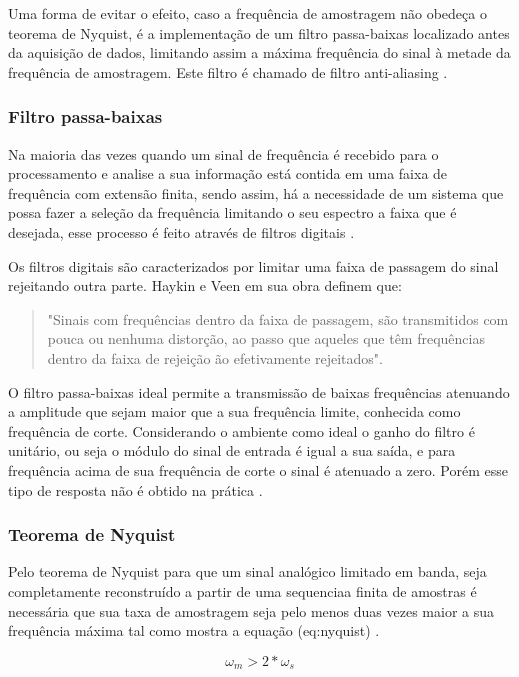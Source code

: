 \documentclass[journal]{IEEEtran}
\begin{document}
Uma forma de evitar o efeito, caso a frequência de amostragem não obedeça o teorema de Nyquist, é a implementação de um filtro passa-baixas localizado antes da aquisição de dados, limitando assim a máxima frequência do sinal à metade da frequência de amostragem. Este filtro é chamado de filtro anti-aliasing \cite{alan}.

\subsubsection{Filtro passa-baixas}
Na maioria das vezes quando um sinal de frequência é recebido para o processamento e analise a sua informação está contida em uma faixa de frequência com extensão finita, sendo assim, há a necessidade de um sistema que possa fazer a seleção da frequência limitando o seu espectro a faixa que é desejada, esse processo é feito através de filtros digitais \cite{haykin}.

Os filtros digitais são caracterizados por limitar uma faixa de passagem do sinal rejeitando outra parte. Haykin e Veen em sua obra definem \cite{haykin} que:

\begin{quote}
    "Sinais com frequências dentro da faixa de passagem, são transmitidos com pouca ou nenhuma distorção, ao passo que aqueles que têm frequências dentro da faixa de rejeição ão efetivamente rejeitados".
\end{quote}

O filtro passa-baixas ideal permite a transmissão de baixas frequências atenuando a amplitude que sejam maior que a sua frequência limite, conhecida como frequência de corte. Considerando o ambiente como ideal o ganho do filtro é unitário, ou seja o módulo do sinal de entrada é igual a sua saída, e para frequência acima de sua frequência de corte o sinal é atenuado a zero. Porém esse tipo de resposta não é obtido na prática \cite{Fernando}.

\subsubsection{Teorema de Nyquist}

Pelo teorema de Nyquist para que um sinal analógico limitado em banda, seja completamente reconstruído a partir de uma sequenciaa finita de amostras é necessária que sua taxa de amostragem seja pelo menos duas vezes maior a sua frequência máxima tal como mostra a equação (eq:nyquist) \cite{alan}.

\begin{equation}\label{eq:nyquist}
    \omega_{m} > 2 * \omega_{s}
\end{equation}
\end{document}
